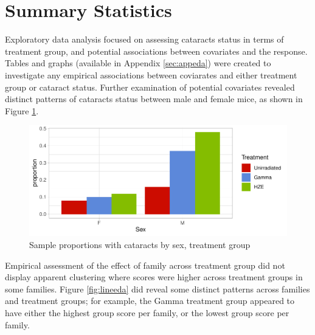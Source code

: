 \documentclass[12pt]{article}
\begin{document}
\section{Summary Statistics}
\label{sec:sumstats}

Exploratory data analysis focused on assessing cataracts status in terms of treatment group, and potential associations between covariates and the response. Tables and graphs (available in Appendix \ref{sec:appeda}) were created to investigate any empirical associations between coviarates and either treatment group or cataract status. Further examination of potential covariates revealed distinct patterns of cataracts status between male and female mice, as shown in Figure \ref{fig:bareda}.\\

\begin{figure}[H]

{\centering \includegraphics{bookdown_report_files/figure-latex/bareda-1} 

}

\caption{Sample proportions with cataracts by sex, treatment group}\label{fig:bareda}
\end{figure}

Empirical assessment of the effect of family across treatment group did not display apparent clustering where scores were higher across treatment groups in some families. Figure \ref{fig:lineeda} did reveal some distinct patterns across families and treatment groups; for example, the Gamma treatment group appeared to have either the highest group score per family, or the lowest group score per family.\\
\end{document}
